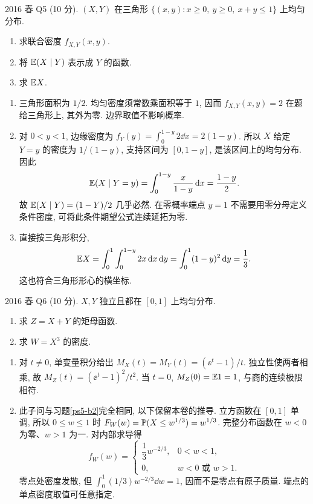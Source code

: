 \begin{exercise}\label{ex:fe2016q5}
2016 春 Q5 (10 分). $(X,Y)$ 在三角形 $\{(x,y):x\ge0,\ y\ge0,\ x+y\le1\}$ 上均匀分布.
\begin{enumerate}[label=(\alph*)]
\item\label{ex:fe2016q5-a} 求联合密度 $f_{X,Y}(x,y)$.
\item\label{ex:fe2016q5-b} 将 $\mathbb E(X\mid Y)$ 表示成 $Y$ 的函数.
\item\label{ex:fe2016q5-c} 求 $\mathbb E X$.
\end{enumerate}
\end{exercise}
\begin{solution}
\begin{enumerate}[label=(\alph*)]
\item\label{sol:fe2016q5-a} 三角形面积为 $1/2$. 均匀密度须常数乘面积等于 $1$, 因而 $f_{X,Y}(x,y)=2$ 在题给三角形上, 其外为零. 边界取值不影响概率.
\item\label{sol:fe2016q5-b} 对 $0<y<1$, 边缘密度为 $f_Y(y)=\int_0^{1-y}2\dd x=2(1-y)$. 所以 $X$ 给定 $Y=y$ 的密度为 $1/(1-y)$, 支持区间为 $[0,1-y]$, 是该区间上的均匀分布. 因此
\[
 \mathbb E(X\mid Y=y)=\int_0^{1-y}\frac{x}{1-y}\,\mathrm d x=\frac{1-y}{2}.
\]
故 $\mathbb E(X\mid Y)=(1-Y)/2$ 几乎必然. 在零概率端点 $y=1$ 不需要用零分母定义条件密度, 可将此条件期望公式连续延拓为零.
\item\label{sol:fe2016q5-c} 直接按三角形积分,
\[
 \mathbb E X=\int_0^1\int_0^{1-y}2x\,\mathrm d x\,\mathrm d y
 =\int_0^1(1-y)^2\,\mathrm d y=\frac13.
\]
这也符合三角形形心的横坐标.
\end{enumerate}
\end{solution}

\begin{exercise}\label{ex:fe2016q6}
2016 春 Q6 (10 分). $X,Y$ 独立且都在 $[0,1]$ 上均匀分布.
\begin{enumerate}[label=(\alph*)]
\item\label{ex:fe2016q6-a} 求 $Z=X+Y$ 的矩母函数.
\item\label{ex:fe2016q6-b} 求 $W=X^3$ 的密度.
\end{enumerate}
\end{exercise}
\begin{solution}
\begin{enumerate}[label=(\alph*)]
\item\label{sol:fe2016q6-a} 对 $t\ne0$, 单变量积分给出 $M_X(t)=M_Y(t)=(\ee^t-1)/t$. 独立性使两者相乘, 故 $M_Z(t)=(\ee^t-1)^2/t^2$. 当 $t=0$, $M_Z(0)=\mathbb E1=1$, 与商的连续极限相符.
\item\label{sol:fe2016q6-b} 此子问与习题\ref{ps5-b2}完全相同, 以下保留本卷的推导. 立方函数在 $[0,1]$ 单调, 所以 $0\le w\le1$ 时 $F_W(w)=\mathbb P(X\le w^{1/3})=w^{1/3}$. 完整分布函数在 $w<0$ 为零、$w>1$ 为一. 对内部求导得
\[
 f_W(w)=\begin{cases}\dfrac13 w^{-2/3},&0<w<1,\\0,&w<0\text{ 或 }w>1.\end{cases}
\]
零点处密度发散, 但 $\int_0^1(1/3)w^{-2/3}\dd w=1$, 因而不是零点有原子质量. 端点的单点密度取值可任意指定.
\end{enumerate}
\end{solution}


